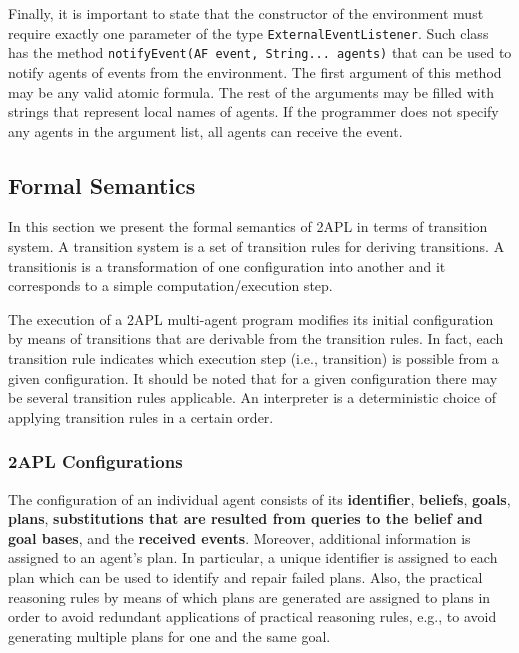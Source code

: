 \documentclass[a4paper]{article}
\begin{document}
Finally, it is important to state that the constructor of the environment must require exactly one parameter of the type \texttt{ExternalEventListener}. Such class has the method \texttt{notifyEvent(AF event, String... agents)} that can be used to notify agents of events from the environment. The first argument of this method may be any valid atomic formula. The rest of the arguments may be filled with strings that represent local names of agents. If the programmer does not specify any agents in the argument list, all agents can receive the event. 

\subsection{Formal Semantics} %

In this section we present the formal semantics of 2APL in terms of transition system. A transition system is a set of transition rules for deriving transitions. A transitionis is a transformation of one configuration into another and it corresponds to a simple computation/execution step.

The execution of a 2APL multi-agent program modifies its initial configuration by means of transitions that are derivable from the transition rules. In fact, each transition rule indicates which execution step (i.e., transition) is possible from a given configuration. It should be noted that for a given configuration there may be several transition rules applicable. An interpreter is a deterministic choice of applying transition rules in a certain order.

\subsubsection{2APL Configurations}

The configuration of an individual agent consists of its \textbf{identifier}, \textbf{beliefs}, \textbf{goals}, \textbf{plans}, \textbf{substitutions that are resulted from queries to the belief and goal bases}, and the \textbf{received events}. Moreover, additional information is assigned to an agent's plan. In particular, a unique identifier is assigned to each plan which can be used to identify and repair failed plans. Also, the practical reasoning rules by means of which plans are generated are assigned to plans in order to avoid redundant applications of practical reasoning rules, e.g., to avoid generating multiple plans for one and the same goal.
\end{document}
